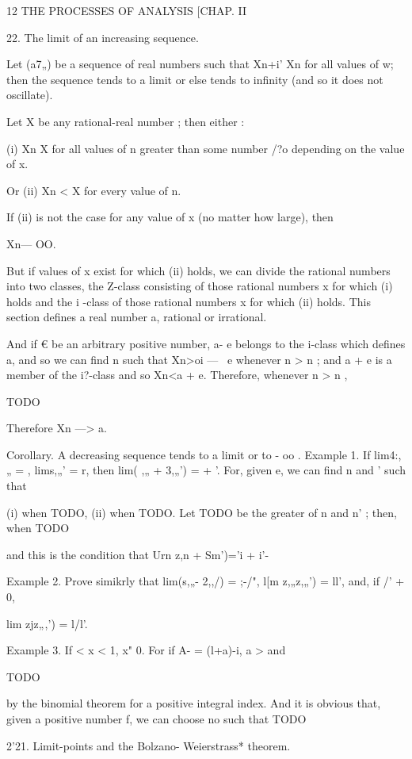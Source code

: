 12 THE PROCESSES OF ANALYSIS [CHAP. II

22. The limit of an increasing sequence.

Let (a7„) be a sequence of real numbers such that Xn+i' Xn for all
values of w; then the sequence tends to a limit or else tends to
infinity (and so it does not oscillate).

Let X be any rational-real number ; then either :

(i) Xn X for all values of n greater than some number /?o depending on
the value of x.

Or (ii) Xn < X for every value of n.

If (ii) is not the case for any value of x (no matter how large), then

Xn— OO.

But if values of x exist for which (ii) holds, we can divide the
rational numbers into two classes, the Z-class consisting of those
rational numbers x for which (i) holds and the i -class of those
rational numbers x for which (ii) holds. This section defines a real
number a, rational or irrational.

And if € be an arbitrary positive number, a- e belongs to the i-class
which defines a, and so we can find n such that Xn>oi — \ e whenever n
> n ; and a + e is a member of the i?-class and so Xn<a + e.
Therefore, whenever n > n ,

TODO

Therefore Xn —> a.

Corollary. A decreasing sequence tends to a limit or to - oo . Example
1. If lim4:,„ = , lims,„' = r, then lim( ,„ + 3,„') = + '. For, given
e, we can find n and ' such that

(i) when TODO, (ii) when TODO. Let TODO be the greater of n and n' ;
then, when TODO

and this is the condition that Urn z,n + Sm')='i + i'-

Example 2. Prove simikrly that lim(s,„- 2,,/) = ;-/", l[m z,„z,„') =
ll', and, if /' + 0,

lim zjz„,') = l/l'.

Example 3. If < x < 1, x" 0. For if A- = (l+a)-i, a > and

TODO

by the binomial theorem for a positive integral index. And it is
obvious that, given a positive number f, we can choose no such that
TODO

2'21. Limit-points and the Bolzano- Weierstrass* theorem.

